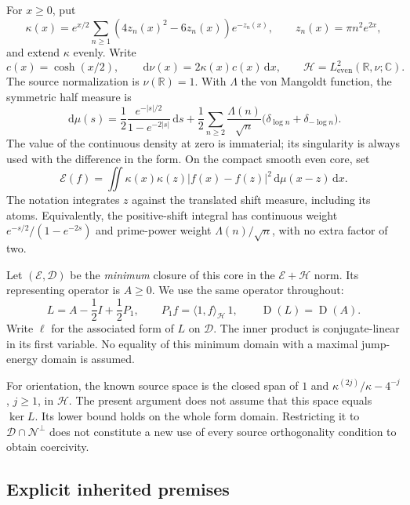 \documentclass[11pt,a4paper]{article}
\newcommand{\R}{\mathbb R}
\newcommand{\C}{\mathbb C}
\newcommand{\HH}{\mathcal H}
\newcommand{\DD}{\mathcal D}
\newcommand{\EE}{\mathcal E}
\newcommand{\NN}{\mathcal N}
\newcommand{\Id}{I}
\newcommand{\Dom}{\operatorname{D}}
\newcommand{\ip}[2]{\langle #1,#2\rangle}
\newcommand{\dd}{\,\mathrm d}
\theoremstyle{definition}
\theoremstyle{remark}
\numberwithin{equation}{section}
\begin{document}
For \(x\ge0\), put
\begin{equation}\label{eq:theta}
 \kappa(x)=e^{x/2}\sum_{n\ge1}(4z_n(x)^2-6z_n(x))e^{-z_n(x)},
 \qquad z_n(x)=\pi n^2e^{2x},
\end{equation}
and extend \(\kappa\) evenly. Write
\begin{equation}\label{eq:hilbert}
 c(x)=\cosh(x/2),\qquad
 \dd\nu(x)=2\kappa(x)c(x)\dd x,\qquad
 \HH=L^2_{\mathrm{even}}(\R,\nu;\C).
\end{equation}
The source normalization is \(\nu(\R)=1\). With
\(\Lambda\) the von Mangoldt function, the symmetric half measure is
\begin{equation}\label{eq:measure}
 \dd\mu(s)=\frac12\frac{e^{-|s|/2}}{1-e^{-2|s|}}\dd s
 +\frac12\sum_{n\ge2}\frac{\Lambda(n)}{\sqrt n}
       \bigl(\delta_{\log n}+\delta_{-\log n}\bigr).
\end{equation}
The value of the continuous density at zero is immaterial; its singularity
is always used with the difference in the form. On the compact smooth
even core, set
\begin{equation}\label{eq:form}
 \EE(f)=\iint\kappa(x)\kappa(z)|f(x)-f(z)|^2
                 \dd\mu(x-z)\dd x.
\end{equation}
The notation integrates \(z\) against the translated shift measure,
including its atoms. Equivalently, the positive-shift integral has
continuous weight \(e^{-s/2}/(1-e^{-2s})\) and prime-power weight
\(\Lambda(n)/\sqrt n\), with no extra factor of two.

Let \((\EE,\DD)\) be the \emph{minimum} closure of this core in the
\(\EE+\HH\) norm. Its representing operator is \(A\ge0\). We use the same
operator throughout:
\begin{equation}\label{eq:L}
 L=A-\frac12\Id+\frac12P_1,\qquad
 P_1f=\ip1f_{\HH}\,1,\qquad \Dom(L)=\Dom(A).
\end{equation}
Write \(\ell\) for the associated form of \(L\) on \(\DD\).
The inner product is conjugate-linear in its first variable.
No equality of this minimum domain with a maximal jump-energy domain
is assumed.

For orientation, the known source space is the closed span of \(1\) and
\(\kappa^{(2j)}/\kappa-4^{-j}\), \(j\ge1\), in \(\HH\). The present
argument does not assume that this space equals \(\ker L\).
Its lower bound holds on the whole form domain. Restricting it to
\(\DD\cap\NN^\perp\) does not constitute a new use of every source
orthogonality condition to obtain coercivity.

\subsection{Explicit inherited premises}\label{sec:premises}
\end{document}

